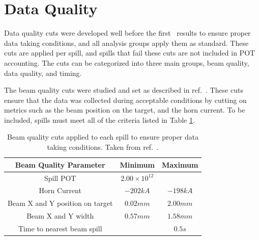 \section{Data Quality}

Data quality cuts were developed well before the first \nova~results to ensure proper data taking conditions, and all analysis groups apply them as standard. These cuts are applied per spill, and spills that fail these cuts are not included in POT accounting. The cuts can be categorized into three main groups, beam quality, data quality, and timing.

The beam quality cuts were studied and set as described in ref.~\cite{ref:TNBeamQual}. These cuts ensure that the data was collected during acceptable conditions by cutting on metrics such as the beam position on the target, and the horn current. To be included, spills must meet all of the criteria listed in Table \ref{tab:BeamQual}.
\begin{table}[h]
  \begin{center}
    \caption[Beam Quality Cuts]{Beam quality cuts applied to each spill to ensure proper data taking conditions. Taken from ref.~\cite{ref:TNBeamQual}.}
    \label{tab:BeamQual}
    \begin{tabular}{c c c}
      \hline\hline
      Beam Quality Parameter & Minimum & Maximum \\
      \hline
      Spill POT & $2.00 \times 10^{12}$ & \\
      Horn Current & $-202\unit{kA}$ & $-198\unit{kA}$ \\
      Beam X and Y position on target & $0.02\unit{mm}$ & $2.00\unit{mm}$ \\
      Beam X and Y width & $0.57\unit{mm}$ & $1.58\unit{mm}$ \\
      Time to nearest beam spill & & $0.5\unit{s}$ \\
      \hline
    \end{tabular}
  \end{center}
\end{table}

